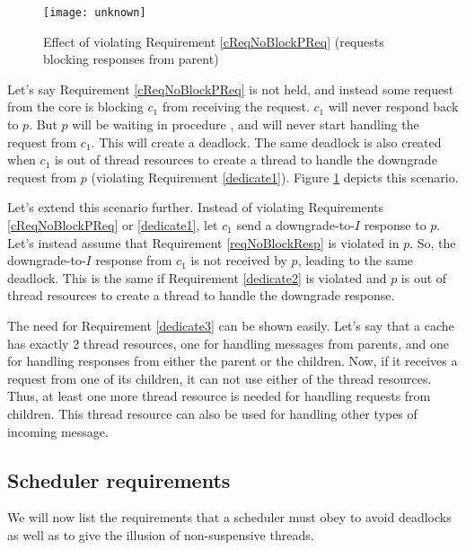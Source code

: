 \begin{figure}
\centering
\texttt{[image: unknown]}
\caption{Effect of violating Requirement \ref{cReqNoBlockPReq} (requests blocking responses from parent)}
\label{unknown}
\end{figure}

Let's say Requirement \ref{cReqNoBlockPReq} is not held, and instead some request
from the core is blocking $c_1$ from receiving the request. $c_1$ will never
respond back to $p$. But $p$ will be waiting in procedure \dReqL{}, and will
never start handling the request from $c_1$. This will create a deadlock.  The
same deadlock is also created when $c_1$ is out of thread resources to create a
thread to handle the downgrade request from $p$ (violating Requirement
\ref{dedicate1}). Figure \ref{unknown} depicts this scenario.

Let's extend this scenario further. Instead of violating Requirements
\ref{cReqNoBlockPReq} or \ref{dedicate1}, let $c_1$
send a downgrade-to-$I$ response to $p$. Let's instead assume that Requirement
\ref{reqNoBlockResp} is violated in $p$. So, the downgrade-to-$I$ response from
$c_1$ is not received by $p$, leading to the same deadlock. This is the same if
Requirement \ref{dedicate2} is violated and $p$ is out of thread resources to
create a thread to handle the downgrade response.

The need for Requirement \ref{dedicate3} can be shown easily. Let's say that a
cache has exactly 2 thread resources, one for handling messages from parents,
and one for handling responses from either the parent or the children. Now, if
it receives a request from one of its children, it can not use either of the
thread resources. Thus, at least one more thread resource is needed for
handling requests from children. This thread resource can also be used for
handling other types of incoming message.

\subsection{Scheduler requirements}

We will now list the requirements that a scheduler must obey to avoid
deadlocks as well as to give the illusion of non-suspensive threads.

